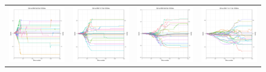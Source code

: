 \begin{figure}
\begin{tabular}{cccc}
\hspace{-0.5cm}\includegraphics[width = 1.55in]{images/Visualizations/GAvsANN/1000ms5x5.png} &
\hspace{-0.5cm}\includegraphics[width = 1.55in]{images/Visualizations/GAvsANN/1000ms7x7.png} &
\hspace{-0.5cm}\includegraphics[width = 1.55in]{images/Visualizations/GAvsANN/1000ms9x9.png} &
\hspace{-0.5cm}\includegraphics[width = 1.55in]{images/Visualizations/GAvsANN/1000ms11x11.png} \\


\end{tabular}
\end{figure}
